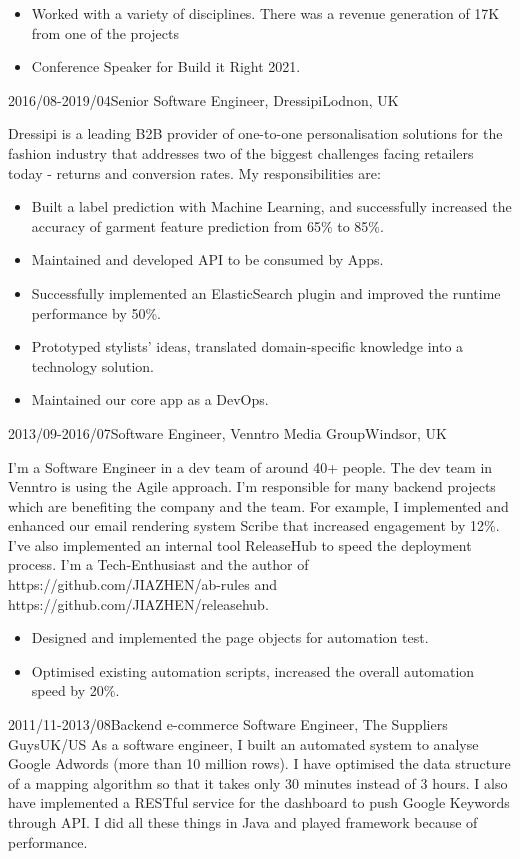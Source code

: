 \documentclass[a4paper]{twentysecondcv-english} %
\begin{document}
\begin{twenty}
{\begin{itemize}
                \item Worked with a variety of disciplines. There was a revenue generation of \£17K from one of the projects
                \item Conference Speaker for Build it Right 2021.
                \end{itemize}}
	\twentyitem
	    {2016/08-2019/04}{Senior Software Engineer, Dressipi}{Lodnon, UK}
    	{Dressipi is a leading B2B provider of one-to-one personalisation solutions for the fashion industry that addresses two of the biggest challenges facing retailers today - returns and conversion rates. My responsibilities are:
        	\begin{itemize}
                \item Built a label prediction with Machine Learning, and successfully increased the accuracy of garment feature prediction from 65\% to 85\%.
                \item Maintained and developed API to be consumed by Apps.
                \item Successfully implemented an ElasticSearch plugin and improved the runtime performance by 50\%.
                \item Prototyped stylists' ideas, translated domain-specific knowledge into a technology solution.
                \item Maintained our core app as a DevOps.
            \end{itemize}}
\end{twenty}

\newpage %
\makesidebar

\begin{twenty}
    \twentyitem
	    {2013/09-2016/07}{Software Engineer, Venntro Media Group}{Windsor, UK}
    	{I'm a Software Engineer in a dev team of around 40+ people. The dev team in Venntro is using the Agile approach. I'm responsible for many backend projects which are benefiting the company and the team. For example, I implemented and enhanced our email rendering system Scribe that increased engagement by 12\%. I've also implemented an internal tool ReleaseHub to speed the deployment process. I'm a Tech-Enthusiast and the author of https://github.com/JIAZHEN/ab-rules and https://github.com/JIAZHEN/releasehub.
        	\begin{itemize}
                \item Designed and implemented the page objects for automation test.
                \item Optimised existing automation scripts, increased the overall automation speed by 20\%.
            \end{itemize}}
    \twentyitem
	    {2011/11-2013/08}{Backend e-commerce Software Engineer, The Suppliers Guys}{UK/US}
    	{As a software engineer, I built an automated system to analyse Google Adwords (more than 10 million rows). I have optimised the data structure of a mapping algorithm so that it takes only 30 minutes instead of 3 hours. I also have implemented a RESTful service for the dashboard to push Google Keywords through API. I did all these things in Java and played framework because of performance.}
\end{twenty}
\end{document}
